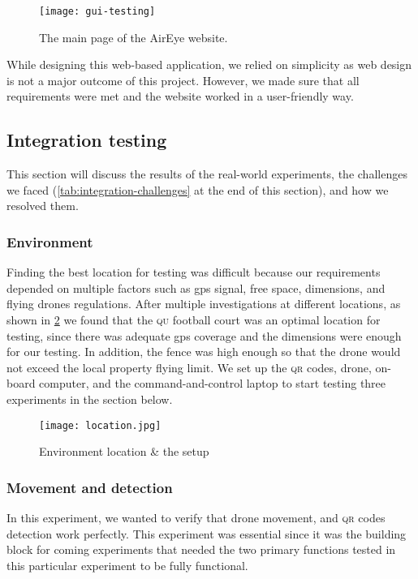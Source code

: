 \documentclass[../main.tex]{subfiles}
\begin{document}
\begin{figure}[tbp]
	\centering
	\texttt{[image: gui-testing]}
	\caption{The main page of the AirEye website.}
	\label{fig:gui-testing}
\end{figure}   

While designing this web-based application, we relied on simplicity as
web design is not a major outcome of this project. However, we made sure that 
all requirements were met and the website worked in a user-friendly way.


\subsection{Integration testing}

This section will discuss the results of the real-world experiments,
the challenges we faced (\cref{tab:integration-challenges} at the end
of this section), and
how we resolved them.

\subsubsection{Environment}

Finding the best location for testing was difficult
because our requirements depended on multiple factors 
such as \gls{gps} signal, free space, dimensions,
and flying drones regulations. After multiple investigations
at different locations, as shown in \cref{fig:testing-location}
we found that the \textsc{qu} football court was an optimal location
for testing, since there was adequate \gls{gps} coverage and the
dimensions were enough for our testing. 
In addition, the fence was high enough so that
the drone would not exceed the local property flying limit.
We set up the \textsc{qr} codes, drone, on-board computer, and the
command-and-control laptop to start testing three experiments in the
section below.

\begin{figure}[tbp]
	\centering
	\texttt{[image: location.jpg]}
	\caption{Environment location \& the setup}
	\label{fig:testing-location}
\end{figure} 

\subsubsection{Movement and detection}

In this experiment, we wanted to verify that drone movement, and
\textsc{qr} codes detection work perfectly. This experiment was 
essential since it was the building block for coming experiments
that needed the two primary functions tested in this particular
experiment to be fully functional.
\end{document}
